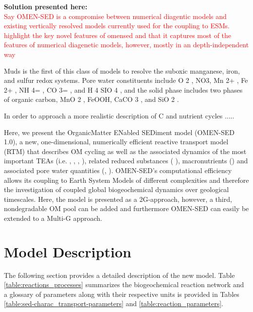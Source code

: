 \documentclass[gmd, manuscript]{copernicus}
\begin{document}

\textbf{Solution presented here:}\\
\textcolor{red}{Say OMEN-SED is a compromise between numerical diagentic models and existing vertically resolved models currently used for the coupling to ESMs. 
 highlight the key novel features of omensed and that it captures most of the features of numerical diagenetic models, however, mostly in an depth-independent way}
 
Muds is the first of this class of models to resolve the suboxic manganese, iron, and sulfur redox systems. Pore water constituents include O 2 , NO3,
Mn 2+ , Fe 2+ , NH 4= , CO 3= , and H 4 SIO 4 , and the solid phase includes two phases of organic carbon, MnO 2 , FeOOH, CaCO 3 , and SiO 2 . 

In order to approach a more realistic description of C and nutrient cycles .....

Here, we present the OrganicMatter ENabled SEDiment model (OMEN-SED 1.0), a new, one-dimensional, numerically efficient reactive transport model (RTM) 
that describes OM cycling as well as the associated dynamics of the most important TEAs (i.e. , , , ), 
related reduced substances ( ), macronutrients () and associated pore water quantities (, ).  
OMEN-SED's computational efficiency allows its coupling to Earth System Models of different complexities and therefore the investigation of coupled global biogeochemical dynamics over geological timescales. 
Here, the model is presented as a 2G-approach, however, a third, nondegradable OM pool can be added and furthermore OMEN-SED can easily be extended to a Multi-G approach. 

\section{Model Description}
The following section provides a detailed description of the new model. Table \ref{table:reactions_processes} summarizes the biogeochemical reaction network and 
a glossary of parameters along with their respective units is provided in Tables \ref{table:sed-charac_transport-parameters} and \ref{table:reaction_parameters}.
\end{document}
